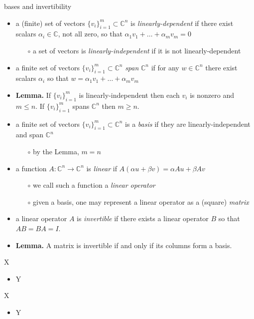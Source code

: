 \documentclass[10pt,hyperref]{beamer}
\newcommand{\CC}{\mathbb{C}}
\begin{document}
\begin{frame}{bases and invertibility}

\begin{itemize}
\item a (finite) set of vectors $\{v_i\}_{i=1}^m \subset \CC^n$ is \emph{linearly-dependent} if there exist scalars $\alpha_i \in \CC$, not all zero, so that $\alpha_1 v_1 + \dots + \alpha_m v_m = 0$
    \begin{itemize}
    \item[$\circ$] a set of vectors is \emph{linearly-independent} if it is not linearly-dependent
    \end{itemize}
\item a finite set of vectors $\{v_i\}_{i=1}^m \subset \CC^n$ \emph{span} $\CC^n$ if for any $w\in \CC^n$ there exist scalars $\alpha_i$ so that $w = \alpha_1 v_1 + \dots + \alpha_m v_m$
\item \textbf{Lemma.}  If $\{v_i\}_{i=1}^m$ is linearly-independent then each $v_i$ is nonzero and $m \le n$.  If $\{v_i\}_{i=1}^m$ spans $\CC^n$ then $m \ge n$.
\item a finite set of vectors $\{v_i\}_{i=1}^m \subset \CC^n$ is a \emph{basis} if they are linearly-independent and span $\CC^n$
    \begin{itemize}
    \item[$\circ$] by the Lemma, $m=n$
    \end{itemize}
\item a function $A:\CC^n \to \CC^n$ is \emph{linear} if $A(\alpha u+\beta v) = \alpha Au + \beta Av$
    \begin{itemize}
    \item[$\circ$] we call such a function a \emph{linear operator}
    \item[$\circ$] given a basis, one may represent a linear operator as a (square) \emph{matrix}
    \end{itemize}
\item a linear operator $A$ is \emph{invertible} if there exists a linear operator $B$ so that $AB=BA=I$.
\item \textbf{Lemma.} A matrix is invertible if and only if its columns form a basis.
\end{itemize}
\end{frame}

\begin{frame}{X}

\begin{itemize}
\item Y
\end{itemize}
\end{frame}

\begin{frame}{X}

\begin{itemize}
\item Y
\end{itemize}
\end{frame}
\end{document}

